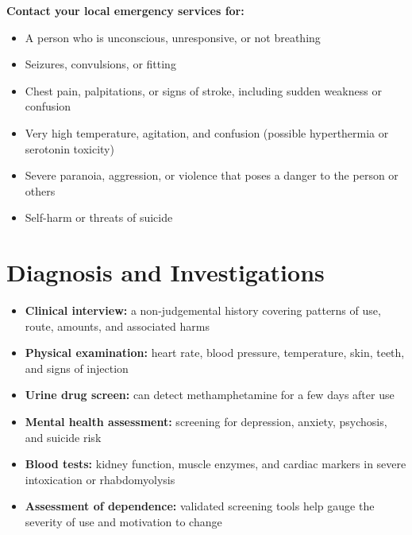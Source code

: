 \textbf{Contact your local emergency services for:}
\begin{itemize}
    \item A person who is unconscious, unresponsive, or not breathing
    \item Seizures, convulsions, or fitting
    \item Chest pain, palpitations, or signs of stroke, including sudden weakness or confusion
    \item Very high temperature, agitation, and confusion (possible hyperthermia or serotonin toxicity)
    \item Severe paranoia, aggression, or violence that poses a danger to the person or others
    \item Self-harm or threats of suicide
\end{itemize}

\section*{Diagnosis and Investigations}
\begin{itemize}
    \item \textbf{Clinical interview:} a non-judgemental history covering patterns of use, route, amounts, and associated harms
    \item \textbf{Physical examination:} heart rate, blood pressure, temperature, skin, teeth, and signs of injection
    \item \textbf{Urine drug screen:} can detect methamphetamine for a few days after use
    \item \textbf{Mental health assessment:} screening for depression, anxiety, psychosis, and suicide risk
    \item \textbf{Blood tests:} kidney function, muscle enzymes, and cardiac markers in severe intoxication or rhabdomyolysis
    \item \textbf{Assessment of dependence:} validated screening tools help gauge the severity of use and motivation to change
\end{itemize}

